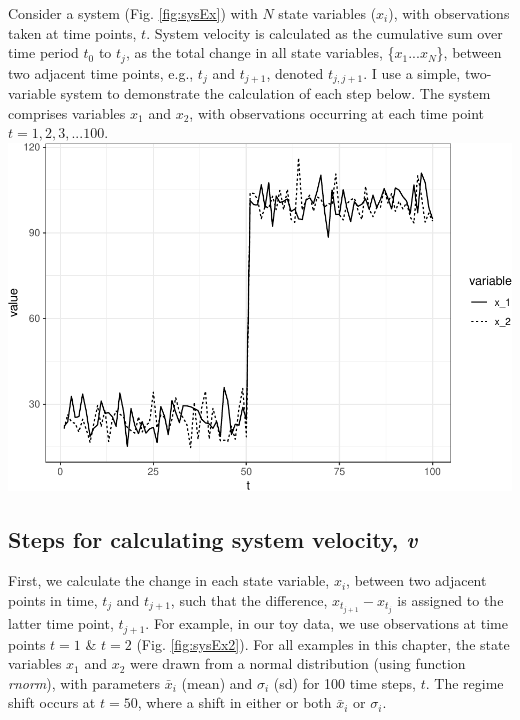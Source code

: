 \documentclass[12pt,twoside,openany]{reedthesis}
\begin{document}
Consider a system (Fig. \ref{fig:sysEx}) with \(N\) state variables
(\(x_i\)), with observations taken at time points, \(t\). System
velocity is calculated as the cumulative sum over time period \(t_0\) to
\(t_j\), as the total change in all state variables, \{\(x_1 ...x_N\)\},
between two adjacent time points, e.g., \(t_j\) and \(t_{j+1}\), denoted
\(t_{j,j+1}\). I use a simple, two-variable system to demonstrate the
calculation of each step below. The system comprises variables \(x_1\)
and \(x_2\), with observations occurring at each time point
\(t = {1,2,3,...100}\).
\includegraphics{_myDissertation_files/figure-latex/sysEx-1.pdf}

\subsection{\texorpdfstring{Steps for calculating system velocity,
\emph{v}}{Steps for calculating system velocity, v}}\label{steps-for-calculating-system-velocity-v}

First, we calculate the change in each state variable, \(x_i\), between
two adjacent points in time, \(t_j\) and \(t_{j+1}\), such that the
difference, \(x_{t_{j+1}} - x_{t_j}\) is assigned to the latter time
point, \(t_{j+1}\). For example, in our toy data, we use observations at
time points \(t = 1\) \& \(t=2\) (Fig. \ref{fig:sysEx2}). For all
examples in this chapter, the state variables \(x_1\) and \(x_2\) were
drawn from a normal distribution (using function \emph{rnorm}), with
parameters \(\bar{x}_i\) (mean) and \(\sigma_i\) (sd) for 100 time
steps, \(t\). The regime shift occurs at \(t=50\), where a shift in
either or both \(\bar{x}_i\) or \(\sigma_i\).
\end{document}
